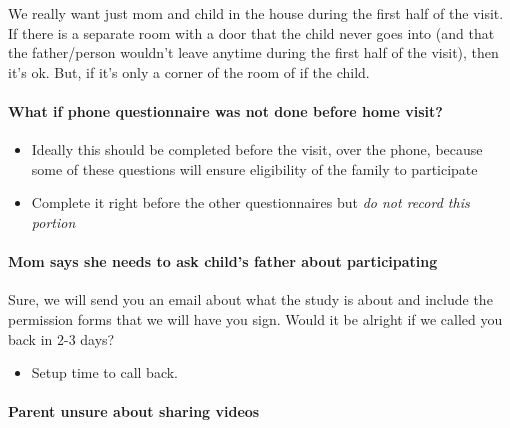 \documentclass[
]{book}
\providecommand{\tightlist}{%
  \setlength{\itemsep}{0pt}\setlength{\parskip}{0pt}}
\begin{document}
We really want just mom and child in the house during the first half of the visit. If there is a separate room with a door that the child never goes into (and that the father/person wouldn't leave anytime during the first half of the visit), then it's ok. But, if it's only a corner of the room of if the child.

\hypertarget{what-if-phone-questionnaire-was-not-done-before-home-visit}{%
\paragraph*{What if phone questionnaire was not done before home visit?}\label{what-if-phone-questionnaire-was-not-done-before-home-visit}}

\begin{itemize}
\tightlist
\item
  Ideally this should be completed before the visit, over the phone, because some of these questions will ensure eligibility of the family to participate\\
\item
  Complete it right before the other questionnaires but \emph{do not record this portion}
\end{itemize}

\hypertarget{mom-says-she-needs-to-ask-childs-father-about-participating}{%
\paragraph*{Mom says she needs to ask child's father about participating}\label{mom-says-she-needs-to-ask-childs-father-about-participating}}

Sure, we will send you an email about what the study is about and include the permission forms that we will have you sign. Would it be alright if we called you back in 2-3 days?

\begin{itemize}
\tightlist
\item
  Setup time to call back.
\end{itemize}

\hypertarget{parent-unsure-about-sharing-videos}{%
\paragraph*{Parent unsure about sharing videos}\label{parent-unsure-about-sharing-videos}}
\end{document}
